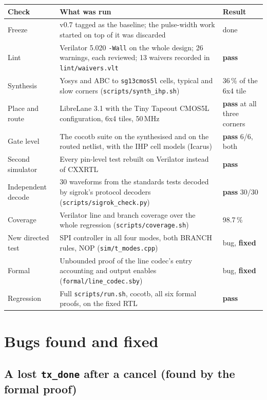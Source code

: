 \documentclass[11pt,a4paper]{article}
\newcommand{\sig}[1]{\texttt{#1}}
\newcommand{\pass}{\textcolor{passc}{\textbf{pass}}}
\newcommand{\fixed}{\textcolor{fixc}{\textbf{fixed}}}
\begin{document}
\begin{center}
\begin{tabularx}{\linewidth}{@{}l L l@{}}
\toprule
Check & What was run & Result \\
\midrule
Freeze & v0.7 tagged as the baseline; the pulse-width work started on top of it was discarded & done \\
Lint & Verilator 5.020 \sig{-Wall} on the whole design; 26 warnings, each reviewed; 13 waivers recorded in \sig{lint/waivers.vlt} & \pass \\
Synthesis & Yosys and ABC to \sig{sg13cmos5l} cells, typical and slow corners (\sig{scripts/synth\_ihp.sh}) & 36\,\% of the 6x4 tile \\
Place and route & LibreLane 3.1 with the Tiny Tapeout CMOS5L configuration, 6x4 tiles, 50\,MHz & \pass{} at all three corners \\
Gate level & The cocotb suite on the synthesised and on the routed netlist, with the IHP cell models (Icarus) & \pass{} 6/6, both \\
Second simulator & Every pin-level test rebuilt on Verilator instead of CXXRTL & \pass{} \\
Independent decode & 30 waveforms from the standards tests decoded by sigrok's protocol decoders (\sig{scripts/sigrok\_check.py}) & \pass{} 30/30 \\
Coverage & Verilator line and branch coverage over the whole regression (\sig{scripts/coverage.sh}) & 98.7\,\% \\
New directed test & SPI controller in all four modes, both BRANCH rules, NOP (\sig{sim/t\_modes.cpp}) & bug, \fixed \\
Formal & Unbounded proof of the line codec's entry accounting and output enables (\sig{formal/line\_codec.sby}) & bug, \fixed \\
Regression & Full \sig{scripts/run.sh}, cocotb, all six formal proofs, on the fixed RTL & \pass \\
\bottomrule
\end{tabularx}
\end{center}

\section{Bugs found and fixed}

\subsection{A lost \sig{tx\_done} after a cancel (found by the formal proof)}
\end{document}
